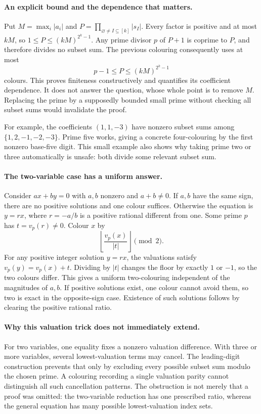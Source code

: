 \documentclass[11pt,a4paper]{article}
\begin{document}
\paragraph{An explicit bound and the dependence that matters.}
Put $M=\max_i|a_i|$ and $P=\prod_{\varnothing\ne I\subseteq[k]}|s_I|$. Every factor is positive and at most $kM$, so $1\leq P\leq(kM)^{2^k-1}$. Any prime divisor $p$ of $P+1$ is coprime to $P$, and therefore divides no subset sum. The previous colouring consequently uses at most
\[
 p-1\leq P\leq(kM)^{2^k-1}
\]
colours. This proves finiteness constructively and quantifies its coefficient dependence. It does not answer the question, whose whole point is to remove $M$. Replacing the prime by a supposedly bounded small prime without checking all subset sums would invalidate the proof.

For example, the coefficients $(1,1,-3)$ have nonzero subset sums among $\{1,2,-1,-2,-3\}$. Prime five works, giving a concrete four-colouring by the first nonzero base-five digit. This small example also shows why taking prime two or three automatically is unsafe: both divide some relevant subset sum.

\paragraph{The two-variable case has a uniform answer.}
Consider $ax+by=0$ with $a,b$ nonzero and $a+b\ne0$. If $a,b$ have the same sign, there are no positive solutions and one colour suffices. Otherwise the equation is $y=rx$, where $r=-a/b$ is a positive rational different from one. Some prime $p$ has $t=v_p(r)\ne0$. Colour $x$ by
\[
 \left\lfloor\frac{v_p(x)}{|t|}\right\rfloor\pmod2.
\]
For any positive integer solution $y=rx$, the valuations satisfy $v_p(y)=v_p(x)+t$. Dividing by $|t|$ changes the floor by exactly $1$ or $-1$, so the two colours differ. This gives a uniform two-colouring independent of the magnitudes of $a,b$. If positive solutions exist, one colour cannot avoid them, so two is exact in the opposite-sign case. Existence of such solutions follows by clearing the positive rational ratio.

\paragraph{Why this valuation trick does not immediately extend.}
For two variables, one equality fixes a nonzero valuation difference. With three or more variables, several lowest-valuation terms may cancel. The leading-digit construction prevents that only by excluding every possible subset sum modulo the chosen prime. A colouring recording a single valuation parity cannot distinguish all such cancellation patterns. The obstruction is not merely that a proof was omitted: the two-variable reduction has one prescribed ratio, whereas the general equation has many possible lowest-valuation index sets.
\end{document}
